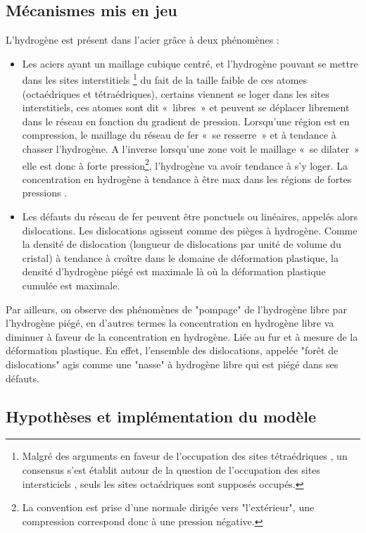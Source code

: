 \documentclass[a4paper, french, 11pt]{article}
\begin{document}
    \subsection{Mécanismes mis en jeu}
    L'hydrogène est présent dans l'acier grâce à deux phénomènes :
    \begin{itemize}
        \item Les aciers ayant un maillage cubique centré, et l’hydrogène pouvant se mettre dans les sites interstitiels
        \footnote{ Malgré des arguments en faveur de l'occupation des sites tétraédriques \cite{sturges_interaction_1969}, un consensus s'est établit autour de la question de l'occupation des sites intersticiels \cite{sofronis_numerical_1989}, seuls les sites octaédriques sont supposés occupés.}
         du fait de la taille faible de  ces atomes (octaédriques et tétraédriques), certains viennent se loger dans les sites interstitiels, ces atomes sont dit « libres » et peuvent se déplacer librement dans le réseau en fonction du gradient de pression. Lorsqu’une région est en compression, le maillage du réseau de fer « se resserre » et à tendance à chasser l’hydrogène. A l’inverse lorsqu’une zone voit le maillage « se dilater » elle est donc à forte pression\footnote{La convention est prise d'une normale dirigée vers "l'extérieur", une compression correspond donc à une pression négative.}, l’hydrogène va avoir tendance à s’y loger. La concentration en hydrogène à tendance à être max dans les régions de fortes pressions \cite{degtyarenko_simulation_2016}.
        \item Les défauts du réseau de fer peuvent être ponctuels ou linéaires, appelés alors dislocations. Les dislocations agissent comme des pièges à hydrogène. Comme la densité de dislocation (longueur de dislocations par unité de volume du cristal) à tendance à croître dans le domaine de déformation plastique, la densité d’hydrogène piégé est maximale là où la déformation plastique cumulée est maximale\cite{oriani_diffusion_1970}.
    \end{itemize}
    Par ailleurs, on observe des phénomènes de "pompage" de l'hydrogène libre par l'hydrogène piégé, en d'autres termes la concentration en hydrogène libre va diminuer à faveur de la concentration en hydrogène. Liée au fur et à mesure de la déformation plastique. En effet, l'ensemble des dislocations, appelée "forêt de dislocations" agis comme une "nasse" à hydrogène libre qui est piégé dans ses défauts.

    \subsection{Hypothèses et implémentation du modèle}
\end{document}
